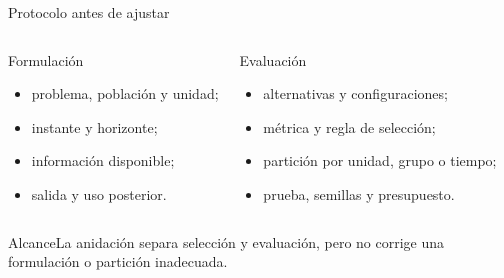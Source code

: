 \documentclass[aspectratio=169,10pt]{beamer}
\begin{document}
\begin{frame}{Protocolo antes de ajustar}
  \small
  \begin{columns}[T]
    \begin{block}{Formulación}
      \begin{itemize}
        \item problema, población y unidad;
        \item instante y horizonte;
        \item información disponible;
        \item salida y uso posterior.
      \end{itemize}
    \end{block}
    \begin{block}{Evaluación}
      \begin{itemize}
        \item alternativas y configuraciones;
        \item métrica y regla de selección;
        \item partición por unidad, grupo o tiempo;
        \item prueba, semillas y presupuesto.
      \end{itemize}
    \end{block}
  \end{columns}
  \begin{alertblock}{Alcance}La anidación separa selección y evaluación, pero no corrige una formulación o partición inadecuada.\end{alertblock}
\end{frame}
\end{document}
